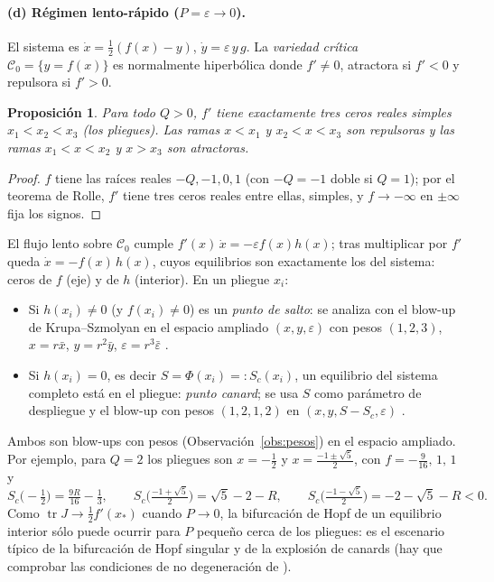 \documentclass[11pt,a4paper,oneside]{book}
\newcommand{\tr}{\operatorname{tr}}
\theoremstyle{plain}
\newtheorem{proposicion}[teorema]{Proposición}
\theoremstyle{definition}
\theoremstyle{remark}
\begin{document}
\paragraph{(d) Régimen lento-rápido ($P=\varepsilon\to0$).} El sistema es $\dot x=\tfrac12(f(x)-y)$, $\dot y=\varepsilon\,y\,g$. La \emph{variedad crítica} $\mathcal C_0=\{y=f(x)\}$ es normalmente hiperbólica donde $f'\neq0$, atractora si $f'<0$ y repulsora si $f'>0$.

\begin{proposicion}\label{prop:pliegues}
Para todo $Q>0$, $f'$ tiene exactamente tres ceros reales simples $x_1<x_2<x_3$ (los \emph{pliegues}). Las ramas $x<x_1$ y $x_2<x<x_3$ son repulsoras y las ramas $x_1<x<x_2$ y $x>x_3$ son atractoras.
\end{proposicion}

\begin{proof}
$f$ tiene las raíces reales $-Q,-1,0,1$ (con $-Q=-1$ doble si $Q=1$); por el teorema de Rolle, $f'$ tiene tres ceros reales entre ellas, simples, y $f\to-\infty$ en $\pm\infty$ fija los signos.
\end{proof}

El flujo lento sobre $\mathcal C_0$ cumple $f'(x)\,\dot x=-\varepsilon f(x)h(x)$; tras multiplicar por $f'$ queda $\dot x=-f(x)\,h(x)$, cuyos equilibrios son exactamente los del sistema: ceros de $f$ (eje) y de $h$ (interior). En un pliegue $x_i$:
\begin{itemize}
\item Si $h(x_i)\neq0$ (y $f(x_i)\ne0$) es un \emph{punto de salto}: se analiza con el blow-up de Krupa--Szmolyan en el espacio ampliado $(x,y,\varepsilon)$ con pesos $(1,2,3)$, $x=r\bar x$, $y=r^2\bar y$, $\varepsilon=r^3\bar\varepsilon$ \cite{KS}.
\item Si $h(x_i)=0$, es decir $S=\Phi(x_i)=:S_c(x_i)$, un equilibrio del sistema completo está en el pliegue: \emph{punto canard}; se usa $S$ como parámetro de despliegue y el blow-up con pesos $(1,2,1,2)$ en $(x,y,S-S_c,\varepsilon)$ \cite{KS}.
\end{itemize}
Ambos son blow-ups con pesos (Observación~\ref{obs:pesos}) en el espacio ampliado. Por ejemplo, para $Q=2$ los pliegues son $x=-\tfrac12$ y $x=\tfrac{-1\pm\sqrt5}2$, con $f=-\tfrac9{16},\,1,\,1$ y
\[
S_c\big(-\tfrac12\big)=\tfrac{9R}{16}-\tfrac13,\qquad
S_c\big(\tfrac{-1+\sqrt5}2\big)=\sqrt5-2-R,\qquad
S_c\big(\tfrac{-1-\sqrt5}2\big)=-2-\sqrt5-R<0.
\]
Como $\tr J\to\tfrac12f'(x_*)$ cuando $P\to0$, la bifurcación de Hopf de un equilibrio interior sólo puede ocurrir para $P$ pequeño cerca de los pliegues: es el escenario típico de la bifurcación de Hopf singular y de la explosión de canards (hay que comprobar las condiciones de no degeneración de \cite{KS}).
\end{document}
